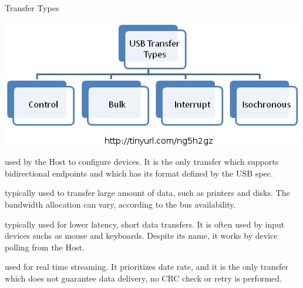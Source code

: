 \documentclass[pdf]{beamer}
\begin{document}
\begin{frame}{Transfer Types}
  \transdissolve
  \begin{center}
    \includegraphics[scale=0.35]{img/transfer_types.jpg}
  \end{center}
  \begin{description}
    \tiny
    \item[Control] used by the Host to configure devices. It is the only transfer
      which supports bidirectional endpoints and which has its format defined by
      the USB spec.
    \item[Bulk] typically used to transfer large amount of data, such as
      printers and disks. The bandwidth allocation can vary, according to the
      bus availability.
    \item[Interrupt] typically used for lower latency, short data transfers. It
      is often used by input devices suchs as mouse and keyboards. Despite its
      name, it works by device polling from the Host.
    \item[Isochronous] used for real time streaming. It prioritizes date rate,
      and it is the only transfer which does not guarantee data delivery, no
      CRC check or retry is performed.
  \end{description}
\end{frame}
\end{document}
